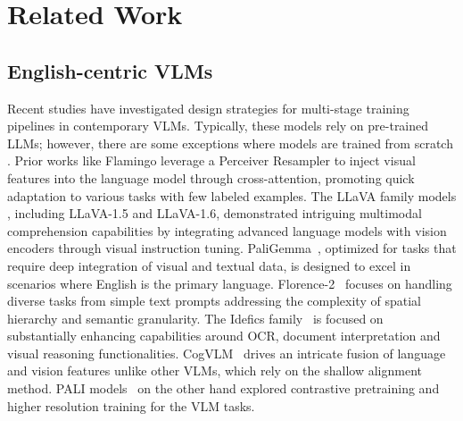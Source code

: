 \section{Related Work}
\label{sec:relwork}

\subsection{English-centric VLMs}
Recent studies \citep{laurenccon2024matters, laurenccon2024building,tong2024cambrian} have investigated design strategies for multi-stage training pipelines in contemporary VLMs. Typically, these models rely on pre-trained LLMs; however, there are some exceptions where models are trained from scratch \citep{team2024chameleon, lu2024unified}. Prior works like Flamingo\citep{alayrac2022flamingo} leverage a Perceiver Resampler \citep{jaegle2021perceiver} to inject visual features into the language model through cross-attention, promoting quick adaptation to various tasks with few labeled examples. The LLaVA family models \citep{liu2024visual,liu2024improved}, including LLaVA-1.5 and LLaVA-1.6, demonstrated intriguing multimodal comprehension capabilities by integrating advanced language models with vision encoders through visual instruction tuning. 
PaliGemma~\citep{beyer2024paligemma}, optimized for tasks that require deep integration of visual and textual data, is designed to excel in scenarios where English is the primary language. Florence-2~\citep{xiao2024florence} focuses on handling diverse tasks from simple text prompts addressing the complexity of spatial hierarchy and semantic granularity. The Idefics family~\citep{laurenccon2024matters,laurenccon2024building} is focused on substantially enhancing capabilities around OCR, document interpretation and visual reasoning functionalities. CogVLM~\citep{wang2023cogvlm} drives an intricate fusion of language and vision features unlike other 
VLMs, which rely on the shallow alignment method. PALI models~\citep{chen2022pali} on the other hand explored contrastive pretraining and higher resolution training for the VLM tasks. 


